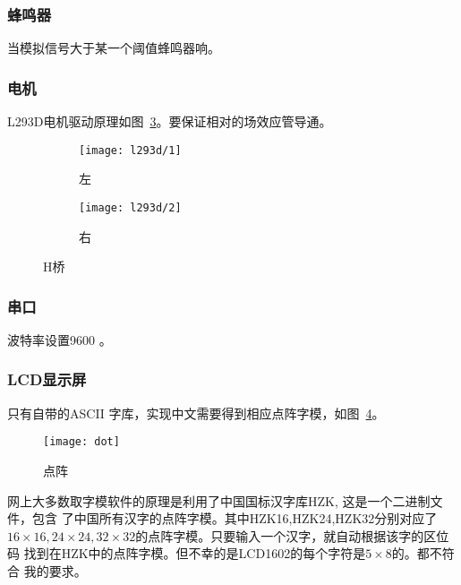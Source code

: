 \documentclass[../main]{subfiles}
\begin{document}
\subsubsection{蜂鸣器}%
\label{ssub:buzzer}

当模拟信号大于某一个阈值蜂鸣器响。

\subsubsection{电机}%
\label{ssub:motor}

L293D电机驱动原理如图~\ref{fig:l293d}。要保证相对的场效应管导通。

\begin{figure}[htpb]
  \centering
  \begin{subfigure}[htbp]{0.45\linewidth}
    \centering
    \texttt{[image: l293d/1]}
    \caption{左}%
    \label{fig:l293d/1}
  \end{subfigure}
  \quad
  \begin{subfigure}[htbp]{0.45\linewidth}
    \centering
    \texttt{[image: l293d/2]}
    \caption{右}%
    \label{fig:l293d/2}
  \end{subfigure}
  \caption{H桥}%
  \label{fig:l293d}
\end{figure}

\subsubsection{串口}%
\label{ssub:serial}

波特率设置9600 。

\subsubsection{LCD显示屏}%
\label{ssub:lcd}

只有自带的ASCII 字库，实现中文需要得到相应点阵字模，如图~\ref{fig:dot}。

\begin{figure}[htpb]
  \centering
  \texttt{[image: dot]}
  \caption{点阵}%
  \label{fig:dot}
\end{figure}

网上大多数取字模软件的原理是利用了中国国标汉字库HZK, 这是一个二进制文件，包含
了中国所有汉字的点阵字模。其中HZK16,HZK24,HZK32分别对应了$16 \times 16, 24
\times 24, 32 \times 32$的点阵字模。只要输入一个汉字，就自动根据该字的区位码
找到在HZK中的点阵字模。但不幸的是LCD1602的每个字符是$5 \times 8$的。都不符合
我的要求。
\end{document}
